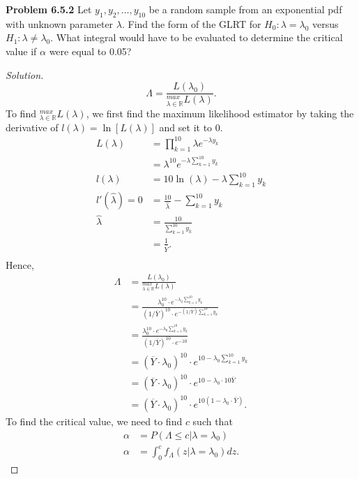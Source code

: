 \documentclass{article}
\begin{document}
\textbf{Problem 6.5.2}
Let $y_1, y_2, \dots, y_{10}$ be a random sample from an exponential pdf with unknown parameter $\lambda$. 
Find the form of the GLRT for $H_0: \lambda = \lambda_0$ versus $H_1: \lambda \neq \lambda_0$. 
What integral would have to be evaluated to determine the critical value if $\alpha$ were equal to 0.05?
\begin{proof}[Solution]
    $$\Lambda = \frac{L(\lambda_0)}{^{max}_{\lambda\in\mathbb{R}}L(\lambda)}.$$
    To find $^{max}_{\lambda\in\mathbb{R}}L(\lambda)$, we first find 
    the maximum likelihood estimator by taking the derivative of $l(\lambda) = \ln[L(\lambda)]$ and set it to 0.
    \begin{align*}
        L(\lambda) & = \prod_{k=1}^{10}\lambda e^{-\lambda y_k} \\
        & = \lambda^{10}e^{-\lambda\sum_{k=1}^{10}y_k} \\
        l(\lambda) & = 10\ln(\lambda) - \lambda\sum_{k=1}^{10}y_k \\
        l'(\hat{\lambda}) = 0 & = \frac{10}{\hat{\lambda}} - \sum_{k=1}^{10}y_k \\
        \hat{\lambda} & = \frac{10}{\sum_{k=1}^{10}y_k} \\
        & = \frac{1}{\overline{Y}}. \\
    \end{align*}
    Hence,
    \begin{align*}
        \Lambda & = \frac{L(\lambda_0)}{^{max}_{\lambda\in\mathbb{R}}L(\lambda)} \\
        & = \frac{\lambda_0^{10}\cdot e^{-\lambda_0\sum_{k=1}^{10}y_k}}{(1/\overline{Y})^{10}\cdot e^{-(1/\overline{Y})\sum_{k=1}^{10}y_k}} \\
        & = \frac{\lambda_0^{10}\cdot e^{-\lambda_0\sum_{k=1}^{10}y_k}}{(1/\overline{Y})^{10}\cdot e^{-10}} \\
        & = (\overline{Y}\cdot \lambda_0)^{10}\cdot e^{10 -\lambda_0\sum_{k=1}^{10}y_k} \\
        & = (\overline{Y}\cdot \lambda_0)^{10}\cdot e^{10 -\lambda_0\cdot 10\overline{Y}} \\
        & = (\overline{Y}\cdot \lambda_0)^{10}\cdot e^{10(1 -\lambda_0\cdot \overline{Y})}.
    \end{align*}
    To find the critical value, we need to find $c$ such that
    \begin{align*}
        \alpha & = P(\Lambda \leq c|\lambda = \lambda_0) \\
        \alpha & = \int_{0}^{c} f_\Lambda(z|\lambda=\lambda_0) dz.
    \end{align*}
\end{proof}
\bigbreak
\end{document}
